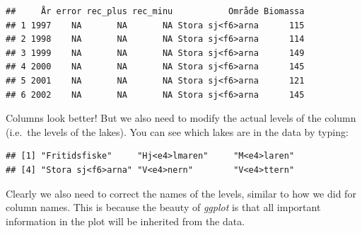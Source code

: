 \documentclass[]{article}
\newenvironment{Shaded}{\begin{snugshade}}{\end{snugshade}}
\newcommand{\KeywordTok}[1]{\textcolor[rgb]{0.13,0.29,0.53}{\textbf{#1}}}
\newcommand{\DataTypeTok}[1]{\textcolor[rgb]{0.13,0.29,0.53}{#1}}
\newcommand{\StringTok}[1]{\textcolor[rgb]{0.31,0.60,0.02}{#1}}
\newcommand{\OperatorTok}[1]{\textcolor[rgb]{0.81,0.36,0.00}{\textbf{#1}}}
\newcommand{\NormalTok}[1]{#1}
\begin{document}
\begin{Shaded}
\end{Shaded}

\begin{verbatim}
##     År error rec_plus rec_minu           Område Biomassa
## 1 1997    NA       NA       NA Stora sj<f6>arna      115
## 2 1998    NA       NA       NA Stora sj<f6>arna      114
## 3 1999    NA       NA       NA Stora sj<f6>arna      149
## 4 2000    NA       NA       NA Stora sj<f6>arna      145
## 5 2001    NA       NA       NA Stora sj<f6>arna      121
## 6 2002    NA       NA       NA Stora sj<f6>arna      145
\end{verbatim}

Columns look better! But we also need to modify the actual levels of the
column (i.e.~the levels of the lakes). You can see which lakes are in
the data by typing:

\begin{Shaded}
\end{Shaded}

\begin{verbatim}
## [1] "Fritidsfiske"     "Hj<e4>lmaren"     "M<e4>laren"      
## [4] "Stora sj<f6>arna" "V<e4>nern"        "V<e4>ttern"
\end{verbatim}

Clearly we also need to correct the names of the levels, similar to how
we did for column names. This is because the beauty of \emph{ggplot} is
that all important information in the plot will be inherited from the
data.

\begin{Shaded}
\end{Shaded}
\end{document}
